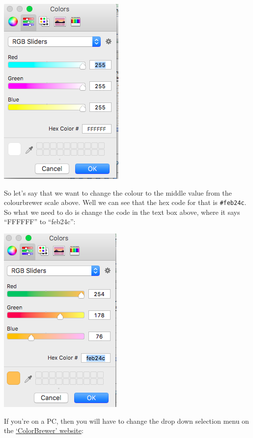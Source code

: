 \documentclass[
]{book}
\begin{document}
\includegraphics{imgs/manual_fill_4.png}

So let's say that we want to change the colour to the middle value from the colourbrewer scale above. Well we can see that the hex code for that is \texttt{\#feb24c}. So what we need to do is change the code in the text box above, where it says ``FFFFFF'' to ``feb24c'':

\includegraphics{imgs/manual_fill_5.png}

If you're on a PC, then you will have to change the drop down selection menu on the \href{https://colorbrewer2.org/\#type=sequential\&scheme=BuGn\&n=3}{`ColorBrewer' website}:
\end{document}
